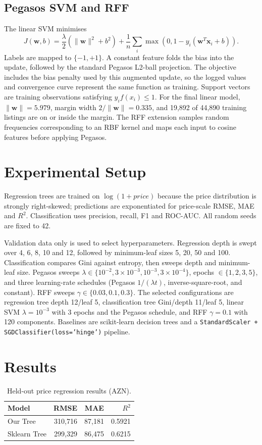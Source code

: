 \documentclass[10pt,twocolumn,a4paper]{article}
\begin{document}
\subsection{Pegasos SVM and RFF}
The linear SVM minimises
\begin{equation}
J(\mathbf{w},b)=\frac{\lambda}{2}(\lVert\mathbf{w}\rVert^2+b^2)+\frac1n\sum_i\max(0,1-y_i(\mathbf{w}^T\mathbf{x}_i+b)).
\end{equation}
Labels are mapped to $\{-1,+1\}$. A constant feature folds the bias into the update, followed by the standard Pegasos L2-ball projection. The objective includes the bias penalty used by this augmented update, so the logged values and convergence curve represent the same function as training. Support vectors are training observations satisfying $y_i f(x_i)\leq 1$. For the final linear model, $\lVert\mathbf{w}\rVert=5.979$, margin width $2/\lVert\mathbf{w}\rVert=0.335$, and 19,892 of 44,890 training listings are on or inside the margin. The RFF extension samples random frequencies corresponding to an RBF kernel and maps each input to cosine features before applying Pegasos.

\section{Experimental Setup}
Regression trees are trained on $\log(1+price)$ because the price distribution is strongly right-skewed; predictions are exponentiated for price-scale RMSE, MAE and $R^2$. Classification uses precision, recall, F1 and ROC-AUC. All random seeds are fixed to 42.

Validation data only is used to select hyperparameters. Regression depth is swept over 4, 6, 8, 10 and 12, followed by minimum-leaf sizes 5, 20, 50 and 100. Classification compares Gini against entropy, then sweeps depth and minimum-leaf size. Pegasos sweeps $\lambda\in\{10^{-2},3\times10^{-3},10^{-3},3\times10^{-4}\}$, epochs $\in\{1,2,3,5\}$, and three learning-rate schedules (Pegasos $1/(\lambda t)$, inverse-square-root, and constant). RFF sweeps $\gamma\in\{0.03,0.1,0.3\}$. The selected configurations are regression tree depth 12/leaf 5, classification tree Gini/depth 11/leaf 5, linear SVM $\lambda=10^{-3}$ with 3 epochs and the Pegasos schedule, and RFF $\gamma=0.1$ with 120 components. Baselines are scikit-learn decision trees and a \texttt{StandardScaler + SGDClassifier(loss='hinge')} pipeline.

\section{Results}
\begin{table}[t]
\centering
\caption{Held-out price regression results (AZN).}
\label{tab:regresults}
\begin{tabular}{@{}lrrr@{}}
\toprule
Model & RMSE & MAE & $R^2$ \\
\midrule
Our Tree & 310,716 & 87,181 & 0.5921 \\
Sklearn Tree & 299,329 & 86,475 & 0.6215 \\
\bottomrule
\end{tabular}
\end{table}
\end{document}
